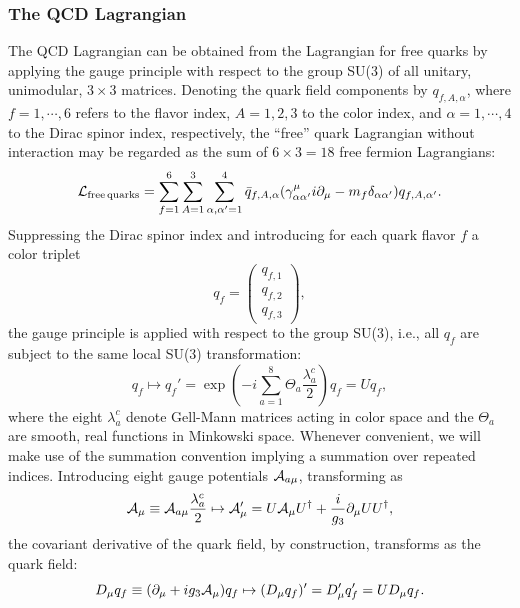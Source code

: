 \documentclass[twoside,12pt]{article}
\begin{document}
\subsubsection{The QCD Lagrangian} \label{sec_qcdl}
   The QCD Lagrangian can be obtained from the
Lagrangian for free quarks by applying the gauge principle with
respect to the group SU(3) of all unitary, unimodular, $3\times 3$ matrices.
   Denoting the quark field components by
$q_{f,A,\alpha}$,
where $f=1,\cdots, 6$ refers to the flavor index,
$A=1,2,3$ to the color index, and $\alpha=1,\cdots,4$ to the Dirac spinor
index, respectively, the ``free'' quark Lagrangian without interaction
may be regarded as the sum of $6\times 3=18$ free fermion Lagrangians:
\begin{equation}
\label{2:1:1:lfq}
{\cal L}_{\rm free\, quarks}
=\sum_{f=1}^6 \sum_{A=1}^3\sum_{\alpha,\alpha'=1}^4
\bar{q}_{f,A,\alpha}(\gamma^\mu_{\alpha\alpha'}i\partial_\mu
-m_f\delta_{\alpha\alpha'})q_{f,A,\alpha'}.
\end{equation}
   Suppressing the Dirac spinor index and introducing for each quark flavor $f$ a color triplet
\begin{equation}
\label{2:1:1:qtriplet}
 q_f=\left(\begin{array}{c}q_{f,1}
\\q_{f,2}\\q_{f,3}\end{array}\right),
\end{equation}
the gauge principle is applied with respect to the group SU(3), i.e., all
$q_f$ are subject to the same local SU(3) transformation:
\begin{equation}
\label{2:1:1:qtraf}
q_f\mapsto q_f'=\exp\left(-i\sum_{a=1}^8 \Theta_a
\frac{\lambda_a^c}{2}\right)q_f=U q_f,
\end{equation}
where the eight $\lambda_a^c$ denote Gell-Mann matrices acting in color space and
the $\Theta_a$ are smooth, real functions in Minkowski space.
   Whenever convenient, we will make use of the summation convention implying a summation
over repeated indices.
   Introducing eight gauge potentials ${\cal A}_{a\mu}$, transforming as
\begin{equation}
\label{2:1:1:atraf}
{\cal A}_\mu\equiv{\cal A}_{a\mu}\frac{\lambda_a^c}{2}\mapsto
{\cal A}_\mu'=
U{\cal A}_\mu U^\dagger +\frac{i}{g_3}\partial_\mu U U^\dagger,
\end{equation}
the covariant derivative of the quark field, by construction, transforms as the quark field:
\begin{equation}
\label{2:1:1:cdq}
D_\mu q_f \equiv (\partial_\mu
 +ig_3{\cal A}_\mu)q_f\mapsto
(D_\mu q_f)'=D'_\mu
q'_f=U D_\mu q_f.
\end{equation}
\end{document}

